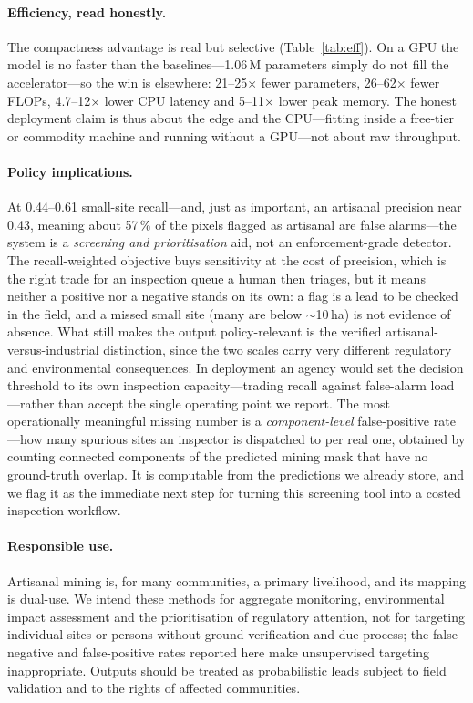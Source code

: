\documentclass[review]{elsarticle}
\begin{document}
\paragraph{Efficiency, read honestly.}
The compactness advantage is real but selective (Table~\ref{tab:eff}). On a GPU the model is
no faster than the baselines---\num{1.06}\,M parameters simply do not fill the
accelerator---so the win is elsewhere: \num{21}--\num{25}$\times$ fewer parameters,
\num{26}--\num{62}$\times$ fewer FLOPs, \num{4.7}--\num{12}$\times$ lower CPU latency and
\num{5}--\num{11}$\times$ lower peak memory. The honest deployment claim is thus about the
edge and the CPU---fitting inside a free-tier or commodity machine and running without a
GPU---not about raw throughput.

\paragraph{Policy implications.}
At \num{0.44}--\num{0.61} small-site recall---and, just as important, an artisanal precision
near \num{0.43}, meaning about \num{57}\,\% of the pixels flagged as artisanal are false
alarms---the system is a \emph{screening and prioritisation} aid, not an enforcement-grade
detector. The recall-weighted objective buys sensitivity at the cost of precision, which is
the right trade for an inspection queue a human then triages, but it means neither a positive
nor a negative stands on its own: a flag is a lead to be checked in the field, and a missed
small site (many are below $\sim$\num{10}\,ha) is not evidence of absence. What still makes
the output policy-relevant is the verified artisanal-versus-industrial distinction, since the
two scales carry very different regulatory and environmental consequences. In deployment an
agency would set the decision threshold to its own inspection capacity---trading recall
against false-alarm load---rather than accept the single operating point we report. The most
operationally meaningful missing number is a \emph{component-level} false-positive rate---how
many spurious sites an inspector is dispatched to per real one, obtained by counting connected
components of the predicted mining mask that have no ground-truth overlap. It is computable
from the predictions we already store, and we flag it as the immediate next step for turning
this screening tool into a costed inspection workflow.

\paragraph{Responsible use.}
Artisanal mining is, for many communities, a primary livelihood, and its mapping is
dual-use. We intend these methods for aggregate monitoring, environmental impact assessment
and the prioritisation of regulatory attention, not for targeting individual sites or
persons without ground verification and due process; the false-negative and false-positive
rates reported here make unsupervised targeting inappropriate. Outputs should be treated as
probabilistic leads subject to field validation and to the rights of affected communities.
\end{document}
